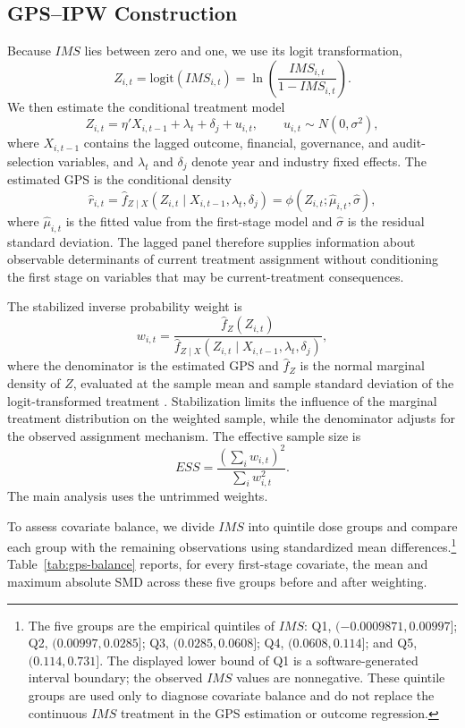 \documentclass[11pt]{article}
\begin{document}
\subsection{GPS--IPW Construction}

Because \(IMS\) lies between zero and one, we use its logit transformation,
\[
Z_{i,t}=\mathrm{logit}(IMS_{i,t})=\ln\left(\frac{IMS_{i,t}}{1-IMS_{i,t}}\right).
\]
We then estimate the conditional treatment model
\[
Z_{i,t}=\eta'X_{i,t-1}+\lambda_t+\delta_j+u_{i,t},
\qquad u_{i,t}\sim N(0,\sigma^2),
\]
where \(X_{i,t-1}\) contains the lagged outcome, financial, governance, and audit-selection variables, and \(\lambda_t\) and \(\delta_j\) denote year and industry fixed effects. The estimated GPS is the conditional density
\[
\widehat r_{i,t}=\widehat f_{Z\mid X}\left(Z_{i,t}\mid X_{i,t-1},\lambda_t,\delta_j\right)
=\phi\left(Z_{i,t};\widehat\mu_{i,t},\widehat\sigma\right),
\]
where \(\widehat\mu_{i,t}\) is the fitted value from the first-stage model and \(\widehat\sigma\) is the residual standard deviation. The lagged panel therefore supplies information about observable determinants of current treatment assignment without conditioning the first stage on variables that may be current-treatment consequences.

The stabilized inverse probability weight is
\[
w_{i,t}=\frac{\widehat f_Z(Z_{i,t})}{\widehat f_{Z\mid X}(Z_{i,t}\mid X_{i,t-1},\lambda_t,\delta_j)},
\]
where the denominator is the estimated GPS and \(\widehat f_Z\) is the normal marginal density of \(Z\), evaluated at the sample mean and sample standard deviation of the logit-transformed treatment \citep{robins2000msm,naimi2014ipw}. Stabilization limits the influence of the marginal treatment distribution on the weighted sample, while the denominator adjusts for the observed assignment mechanism. The effective sample size is
\[
ESS=\frac{\left(\sum_i w_{i,t}\right)^2}{\sum_i w_{i,t}^2}.
\]
The main analysis uses the untrimmed weights.

To assess covariate balance, we divide \(IMS\) into quintile dose groups and compare each group with the remaining observations using standardized mean differences.\footnote{The five groups are the empirical quintiles of \(IMS\): Q1, \((-0.0009871,0.00997]\); Q2, \((0.00997,0.0285]\); Q3, \((0.0285,0.0608]\); Q4, \((0.0608,0.114]\); and Q5, \((0.114,0.731]\). The displayed lower bound of Q1 is a software-generated interval boundary; the observed \(IMS\) values are nonnegative. These quintile groups are used only to diagnose covariate balance and do not replace the continuous \(IMS\) treatment in the GPS estimation or outcome regression.} Table~\ref{tab:gps-balance} reports, for every first-stage covariate, the mean and maximum absolute SMD across these five groups before and after weighting.
\end{document}
